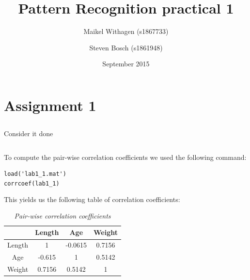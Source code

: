 \documentclass{article}
\title{Pattern Recognition practical 1}
\author{Maikel Withagen (s1867733) \and Steven Bosch (s1861948)}
\date{September 2015}
\begin{document}
\maketitle

\section{Assignment 1}
\subsection{}
Consider it done
\subsection{}
To compute the pair-wise correlation coefficients we used the following command:
\begin{lstlisting}[title= Input]
load('lab1_1.mat')
corrcoef(lab1_1)
\end{lstlisting}
This yields us the following table of correlation coefficients:
\begin{table}[H]
	\caption{\textit{Pair-wise correlation coefficients}}
	\vspace{0.1cm}
	\centering
	\begin{tabular}{|c|c|c|c|}
		\hline
		& Length & Age & Weight \\
		\hline
		Length & 1 & -0.0615 & 0.7156 \\
		\hline
		Age & -0.615 & 1 & 0.5142 \\
		\hline
		Weight & 0.7156 & 0.5142 & 1 \\ 
		\hline
	\end{tabular}
	\label{tab1.2}
\end{table}

\subsection{}
\end{document}
